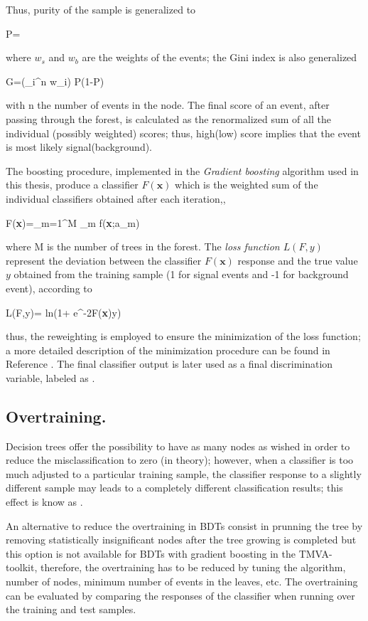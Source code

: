 Thus, purity of the sample is generalized to 

\beqn
P=
\eeqn

\noindent where $w_s$ and $w_b$ are the weights of the events; the Gini index is also generalized

\beqn
G=\left(\sum_i^n w_i\right) P(1-P)
\eeqn

\noindent with n the number of events in the node. The final score of an event, after passing through the forest, is calculated as the renormalized sum of all the individual (possibly weighted) scores; thus, high(low) score implies that the event is most likely signal(background).   

The boosting procedure, implemented in the  \textit{Gradient boosting} algorithm used in this thesis, produce a classifier $F(\textbf{x})$ which is the weighted sum of the individual classifiers obtained after each iteration,\ie,   

\beqn
F(\textbf{x})=\sum_{m=1}^M \beta_m f(\textbf{x};a_m)
\eeqn

\noindent where M is the number of trees in the forest. The \textit{loss function $L(F,y)$} represent the deviation between the classifier $F(\textbf{x})$ response and the true value $y$ obtained from the training sample (1 for signal events and -1 for background event), according to 

\beqn
L(F,y)= \textrm{ln}(1+ e^{-2F(\textbf{x})y})
\eeqn

\noindent thus, the reweighting is employed to ensure the minimization of the loss function; a more detailed description of the minimization procedure can be found in Reference \cite{friedman}. The final classifier output is later used as a final discrimination variable, labeled as .

\subsection{Overtraining.}

Decision trees offer the possibility to have as many nodes as wished in order to reduce the misclassification to zero (in theory); however, when a classifier is too much adjusted to a particular training sample, the classifier response to a slightly different sample may leads to a completely different classification results; this effect is know as .

An alternative to reduce the overtraining in BDTs consist in prunning the tree by removing statistically insignificant nodes after the tree growing is completed but this option is not available for BDTs with gradient boosting in the TMVA-toolkit, therefore, the overtraining has to be reduced by tuning the algorithm, number of nodes, minimum number of events in the leaves, etc. The overtraining can be evaluated by comparing the responses of the classifier when running over the training and test samples.   

